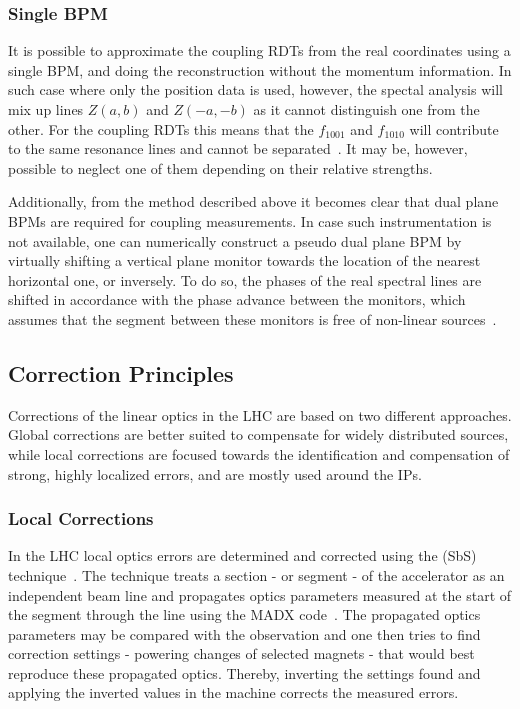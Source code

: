 \subsubsection*{Single BPM}

It is possible to approximate the coupling \glspl{RDT} from the real coordinates using a single \gls{BPM}, and doing the reconstruction without the momentum information.
In such case where only the position data is used, however, the spectal analysis will mix up lines \(Z(a,b)\) and \(Z(-a, -b)\) as it cannot distinguish one from the other.
For the coupling RDTs this means that the \(f_{1001}\) and \(f_{1010}\) will contribute to the same resonance lines and cannot be separated~\cite{PHD:Persson}.
It may be, however, possible to neglect one of them depending on their relative strengths.

Additionally, from the method described above it becomes clear that dual plane BPMs are required for coupling measurements.
In case such instrumentation is not available, one can numerically construct a pseudo dual plane BPM by virtually shifting a vertical plane monitor towards the location of the nearest horizontal one, or inversely.
To do so, the phases of the real spectral lines are shifted in accordance with the phase advance between the monitors, which assumes that the segment between these monitors is free of non-linear sources~\cite{PHD:Vanbavinckhove}.

\subsection{Correction Principles}
\label{subsection:correction_principles}

Corrections of the linear optics in the \gls{LHC} are based on two different approaches.
Global corrections are better suited to compensate for widely distributed sources, while local corrections are focused towards the identification and compensation of strong, highly localized errors, and are mostly used around the \glspl{IP}.

\subsubsection*{Local Corrections}

In the LHC local optics errors are determined and corrected using the  (SbS) technique~\cite{PRAB:Tomas:CERN_LHC_OMC,PRAB:Tomas:Review_Linear_Optics_Measurements}.
The technique treats a section - or segment - of the accelerator as an independent beam line and propagates optics parameters measured at the start of the segment through the line using the \gls{MADX} code~\cite{CODE:MADX_guide}.
The propagated optics parameters may be compared with the observation and one then tries to find correction settings - powering changes of selected magnets - that would best reproduce these propagated optics.
Thereby, inverting the settings found and applying the inverted values in the machine corrects the measured errors.

